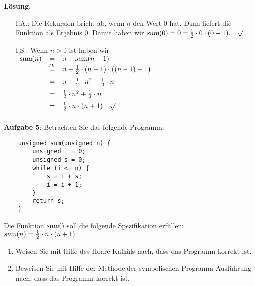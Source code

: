 \documentclass{article}
\begin{document}
\noindent
\textbf{L\"osung}:
\begin{enumerate}
\item[I.A.:] Die Rekursion bricht ab, wenn $n$ den Wert $0$ hat.  Dann liefert die Funktion
             als Ergebnis 0.  Damit haben wir
             $\textsl{sum}(0) = 0 = \frac{1}{2} \cdot 0 \cdot (0 + 1).\quad \surd$
\item[I.S.:] Wenn $n > 0$ ist haben wir
             \\[0.2cm]
             \hspace*{1.3cm}
             $
             \begin{array}[t]{lcl}
               \textsl{sum}(n) & = & n + \textsl{sum}(n-1)  \\
                               & \stackrel{IV}{=} 
                               & n + \frac{1}{2} \cdot (n-1) \cdot \bigl((n-1) + 1\bigr)  \\[0.2cm]
                               & = & n + \frac{1}{2} \cdot n^2 - \frac{1}{2} \cdot n  \\[0.2cm]
                               & = & \frac{1}{2} \cdot n^2 + \frac{1}{2} \cdot n  \\[0.2cm]
                               & = & \frac{1}{2} \cdot n \cdot (n + 1) \quad \surd \\[0.2cm]
             \end{array}
             $
\end{enumerate}
\pagebreak

\noindent
\textbf{Aufgabe 5}:  Betrachten Sie das folgende Programm:
\begin{verbatim}
    unsigned sum(unsigned n) {
        unsigned i = 0;
        unsigned s = 0;
        while (i <= n) {
            s = i + s;
            i = i + 1;
        }
        return s;
    }
\end{verbatim}
Die Funktion $\textsl{sum}()$ soll die folgende Spezifikation erf\"ullen:
\\[0.2cm]
\hspace*{1.3cm} $\textsl{sum}(n) = \frac{1}{2} \cdot n \cdot (n + 1)$
\begin{enumerate}
\item Weisen Sie mit Hilfe des Hoare-Kalk\"uls nach, dass das Programm korrekt ist.
\item Beweisen Sie mit Hilfe der Methode der symbolischen Programm-Ausf\"uhrung nach,
      dass das Programm korrekt ist.
\end{enumerate}
\vspace{0.3cm}
\end{document}
